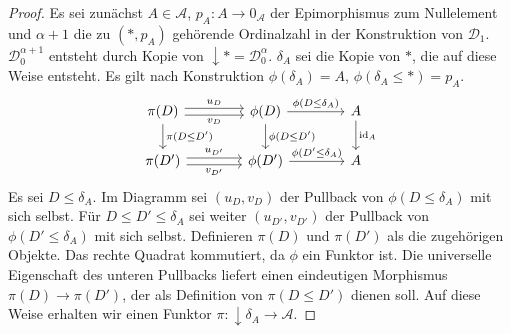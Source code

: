 \documentclass[a4paper, parskip=half]{scrartcl}
\theoremstyle{marginbreak}
\theoremstyle{nonumberplain}
\newtheorem{proof}{Beweis.}
\newcommand\cat\mathcal
\newcommand{\down}[1]{{\downarrow}#1}
\newcommand{\n}{\pgfmatrixnextcell}
\DeclareMathOperator{\id}{id}
\begin{document}
{\begin{proof}
			Es sei zunächst $A\in\cat{A}$, $p_A\colon A\to 0_\cat{A}$ der Epimorphismus
			zum Nullelement und $\alpha+1$ die zu $(*, p_A)$ gehörende Ordinalzahl
			in der Konstruktion von $\cat{D}_1$. $\cat{D}_0^{\alpha+1}$ entsteht durch
			Kopie von $\down{*}=\cat{D}_0^\alpha$. $\delta_A$ sei die Kopie von $*$,
			die auf diese Weise entsteht. Es gilt nach Konstruktion $\phi(\delta_A)=A$,
			$\phi(\delta_A\leq *)=p_A$.
			\[
				\begin{tikzcd}[column sep=4em]
					\pi(D)
						\ar[shift left]{r}{u_D}
						\ar[shift right, ']{r}{v_D}
						\ar{d}{\pi(D\leq D')} \n
					\phi(D)
						\ar{r}{\phi(D\leq\delta_A)}
						\ar{d}{\phi(D\leq D')} \n
					A
						\ar{d}{\id_A} \\
					\pi(D')
						\ar[shift left]{r}{u_{D'}}
						\ar[shift right, ']{r}{v_{D'}} \n
					\phi(D')
						\ar{r}{\phi(D'\leq\delta_A)} \n
					A
				\end{tikzcd}
			\]
			Es sei $D\leq\delta_A$. Im Diagramm sei $(u_D, v_D)$ der Pullback von $\phi(D\leq\delta_A)$ mit
			sich selbst. Für $D\leq D'\leq\delta_A$ sei weiter $(u_{D'}, v_{D'})$
			der Pullback von $\phi(D'\leq\delta_A)$ mit sich selbst. Definieren
			$\pi(D)$ und $\pi(D')$ als die zugehörigen Objekte. Das rechte
			Quadrat kommutiert, da $\phi$ ein Funktor ist. Die universelle Eigenschaft
			des unteren Pullbacks liefert einen eindeutigen Morphismus $\pi(D)\to\pi(D')$,
			der als Definition von $\pi(D\leq D')$ dienen soll. Auf diese Weise erhalten wir
			einen Funktor $\pi\colon\down{\delta_A}\to\cat{A}$.


\end{proof}}
\end{document}
